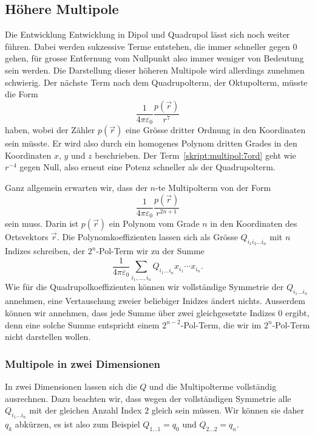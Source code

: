 \subsection{Höhere Multipole}
Die Entwicklung Entwicklung in Dipol und Quadrupol lässt sich noch
weiter führen.
Dabei werden sukzessive Terme entstehen, die immer schneller gegen $0$
gehen, für grosse Entfernung vom Nullpunkt also immer weniger von
Bedeutung sein werden.
Die Darstellung dieser höheren Multipole wird allerdings zunehmen
schwierig. 
Der nächste Term nach dem Quadrupolterm, der Oktupolterm, müsste die Form
\begin{equation}
\frac1{4\pi\varepsilon_0}\frac{p(\vec r)}{r^7}
\label{skript:multipol:7ord}
\end{equation}
haben, wobei der Zähler $p(\vec r)$ eine Grösse dritter Ordnung in
den Koordinaten sein müsste.
Er wird also durch ein homogenes Polynom dritten Grades in den Koordinaten
$x$, $y$ und $z$ beschrieben.
Der Term~\eqref{skript:multipol:7ord} geht wie $r^{-4}$ gegen Null,
also erneut eine Potenz schneller als der Quadrupolterm.

Ganz allgemein erwarten wir, dass der $n$-te Multipolterm von der Form
\[
\frac{1}{4\pi\varepsilon_0} \frac{p(\vec r)}{r^{2n+1}}
\]
sein muss.
Darin ist $p(\vec r)$ ein Polynom vom Grade $n$ in den Koordinaten
des Ortsvektors $\vec r$.
Die Polynomkoeffizienten lassen sich als Grösse $Q_{i_1i_2\dots i_n}$
mit $n$ Indizes schreiben,
der $2^n$-Pol-Term wir zu der Summe
\begin{equation}
\frac{1}{4\pi\varepsilon_0}
\sum_{i_1,\dots,i_n} Q_{i_1\dots i_n} x_{i_1}\cdots x_{i_n}.
\label{skript:multipol:npolterm}
\end{equation}
Wie für die Quadrupolkoeffizienten können wir vollständige Symmetrie
der $Q_{i_1\dots i_n}$ annehmen, eine Vertauschung zweier beliebiger
Inidzes ändert nichts.
Ausserdem können wir annehmen, dass jede Summe über zwei gleichgesetzte
Indizes $0$ ergibt, denn eine solche Summe entspricht einem $2^{n-2}$-Pol-Term,
die wir im $2^n$-Pol-Term nicht darstellen wollen.

\subsubsection{Multipole in zwei Dimensionen}
In zwei Dimensionen lassen sich die $Q$ und die Multipolterme vollständig
ausrechnen.
Dazu beachten wir, dass wegen der vollständigen Symmetrie alle 
$Q_{i_1\dots i_n}$ mit der gleichen Anzahl Index $2$ gleich sein
müssen.
Wir können sie daher $q_k$ abkürzen, es ist also zum Beispiel
$Q_{1\dots 1}=q_0$ und $Q_{2\dots 2}=q_n$.

